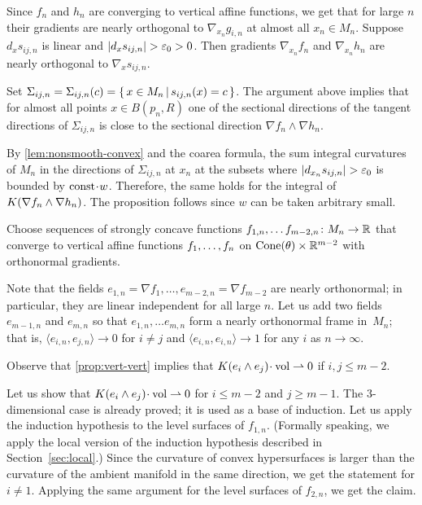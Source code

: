 Since $f_n$ and $h_n$ are converging to vertical affine functions, we get that for large $n$ their gradients are nearly orthogonal to $\nabla_{x_n} g_{i,n}$ at almost all $x_n\in M_n$.
Suppose $d_xs_{ij,n}$ is linear and $|d_xs_{ij,n}|>\eps_0>0$.
Then gradients $\nabla_{x_n}f_n$ and $\nabla_{x_n}h_n$ are nearly orthogonal to $\nabla_x s_{ij,n}$.

Set $\Sigma_{ij,n}=\Sigma_{ij,n}(c)=\left\{\,x\in M_n\,\middle|\,s_{ij,n}(x)=c\,\right\}$.
The argument above implies that for almost all points $x\in B(p_n,R)$ one of the sectional directions of the tangent directions of $\Sigma_{ij,n}$ is close to the sectional direction $\nabla f_n\wedge\nabla h_n$.

By \ref{lem:nonsmooth-convex} and the coarea formula, the sum integral curvatures of $M_n$ in the directions of $\Sigma_{ij,n}$ at $x_n$ at the subsets where $|d_{x_n}s_{ij,n}|>\eps_0$ is bounded by $\const\cdot w$.
Therefore, the same holds for the integral of $K(\nabla f_n\zz\wedge\nabla h_n)$.
The proposition follows since $w$ can be taken arbitrary small.
\qeds


Choose sequences of strongly concave functions $f_{1,n},\dots f_{m-2,n}\colon M_n\to \mathbb{R}$ that converge to vertical affine functions $f_1,\zz\dots,f_n$ on  $\operatorname{Cone}(\theta)\times \mathbb{R}^{m-2}$ with orthonormal gradients.

Note that the fields $e_{1,n}=\nabla f_1,\dots,e_{m-2,n}=\nabla f_{m-2}$ are nearly orthonormal;
in particular, they are linear independent for all large $n$.
Let us add two fields $e_{m-1,n}$ and $e_{m,n}$  so that $e_{1,n},\dots e_{m,n}$ form a nearly orthonormal frame in~$M_n$;
that is, $\langle e_{i,n}, e_{j,n}\rangle\to 0$ for $i\ne j$ and $\langle e_{i,n}, e_{i,n}\rangle\to 1$ for any $i$ as $n\to\infty$.

Observe that \ref{prop:vert-vert} implies that $K(e_i\wedge e_j)\cdot\vol\rightharpoonup 0$ if $i,j\le m-2$.

Let us show that $K(e_i\wedge e_j)\cdot\vol\rightharpoonup 0$ for $i\le m-2$ and $j\ge m-1$.
The $3$-dimensional case is already proved; it is used as a base of induction.
Let us apply the induction hypothesis to the level surfaces of $f_{1,n}$.
(Formally speaking, we apply the local version of the induction hypothesis described in Section~\ref{sec:local}.)
Since the curvature of convex hypersurfaces is larger than the curvature of the ambient manifold in the same direction, we get the statement for $i\ne 1$.
Applying the same argument for the level surfaces of $f_{2,n}$, we get the claim.

